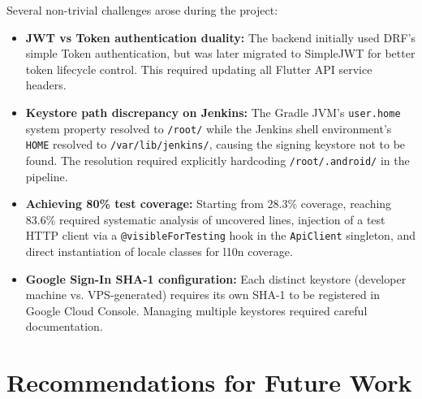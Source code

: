 \documentclass[12pt, a4paper]{report}
\begin{document}
Several non-trivial challenges arose during the project:
\begin{itemize}[leftmargin=*]
  \item \textbf{JWT vs Token authentication duality:} The backend initially used DRF's simple Token authentication, but was later migrated to SimpleJWT for better token lifecycle control. This required updating all Flutter API service headers.
  \item \textbf{Keystore path discrepancy on Jenkins:} The Gradle JVM's \texttt{user.home} system property resolved to \texttt{/root/} while the Jenkins shell environment's \texttt{HOME} resolved to \texttt{/var/lib/jenkins/}, causing the signing keystore not to be found. The resolution required explicitly hardcoding \texttt{/root/.android/} in the pipeline.
  \item \textbf{Achieving 80\% test coverage:} Starting from 28.3\% coverage, reaching 83.6\% required systematic analysis of uncovered lines, injection of a test HTTP client via a \texttt{@visibleForTesting} hook in the \texttt{ApiClient} singleton, and direct instantiation of locale classes for l10n coverage.
  \item \textbf{Google Sign-In SHA-1 configuration:} Each distinct keystore (developer machine vs. VPS-generated) requires its own SHA-1 to be registered in Google Cloud Console. Managing multiple keystores required careful documentation.
\end{itemize}

\section{Recommendations for Future Work}
\end{document}

